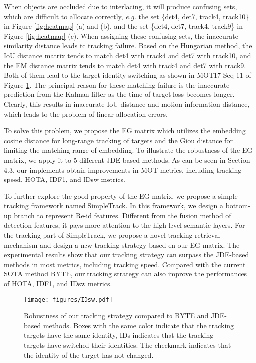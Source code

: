 \documentclass[runningheads]{llncs}
\begin{document}
When objects are occluded due to interlacing, it will produce confusing sets, which are difficult to allocate correctly, \emph{e.g.} the set \{det4, det7, track4, track10\} in Figure \ref{fig:heatmap} (a) and (b), and the set \{det4, det7, track4, track9\} in Figure \ref{fig:heatmap} (c). When assigning these confusing sets, the inaccurate similarity distance leads to tracking failure. Based on the Hungarian method, the IoU distance matrix tends to match det4 with track4 and det7 with track10, and the EM distance matrix tends to match det4 with track4 and det7 with track9. Both of them lead to the target identity switching as shown in MOT17-Seq-11 of Figure \ref{fig:IDsw}. The principal reason for these matching failure is the inaccurate prediction from the Kalman filter as the time of target loss becomes longer. Clearly, this results in inaccurate IoU distance and motion information distance, which leads to the problem of linear allocation errors.

To solve this problem, we propose the EG matrix which utilizes the embedding cosine distance for long-range tracking of targets and the Giou distance for limiting the matching range of embedding. To illustrate the robustness of the EG matrix, we apply it to 5 different JDE-based methods. As can be seen in Section 4.3, our implements obtain improvements in MOT metrics, including tracking speed, HOTA, IDF1, and IDsw metrics.  

To further explore the good property of the EG matrix, we propose a simple tracking framework named SimpleTrack. In this framework, we design a bottom-up branch to represent Re-id features. Different from the fusion method of detection features, it pays more attention to the high-level semantic layers. For the tracking part of SimpleTrack, we propose a novel tracking retrieval mechanism and design a new tracking strategy based on our EG matrix. The experimental results show that our tracking strategy can surpass the JDE-based methods in most metrics, including tracking speed. Compared with the current SOTA method BYTE, our tracking strategy can also improve the performances of HOTA, IDF1, and IDsw metrics. 

\begin{figure}
\centering
\texttt{[image: figures/IDsw.pdf]}
\caption{Robustness of our tracking strategy compared to BYTE and JDE-based methods. Boxes with the same color indicate that the tracking targets have the same identity, IDs indicates that the tracking targets have switched their identities. The checkmark indicates that the identity of the target has not changed.}
\label{fig:IDsw}
\end{figure}
\end{document}

